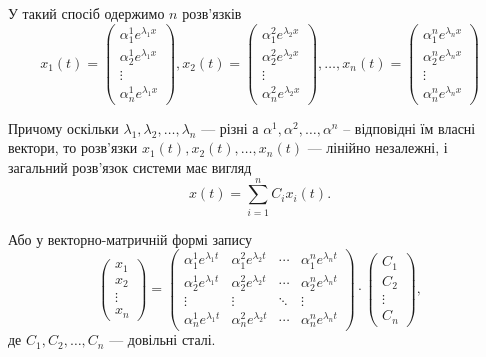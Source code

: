\begin{enumerate}
У такий спосіб одержимо $n$ розв'язків
\begin{equation*}
	x_1(t) = \begin{pmatrix} \alpha_1^1 e^{\lambda_1 x} \\ \alpha_2^1 e^{\lambda_1 x} \\ \vdots \\ \alpha_n^1 e^{\lambda_1 x} \end{pmatrix}, 
	x_2(t) = \begin{pmatrix} \alpha_1^2 e^{\lambda_2 x} \\ \alpha_2^2 e^{\lambda_2 x} \\ \vdots \\ \alpha_n^2 e^{\lambda_2 x} \end{pmatrix},
	\ldots, 
	x_n(t) = \begin{pmatrix} \alpha_1^n e^{\lambda_n x} \\ \alpha_2^n e^{\lambda_n x} \\ \vdots \\ \alpha_n^n e^{\lambda_n x} \end{pmatrix}
\end{equation*}

Причому оскільки $\lambda_1, \lambda_2, \ldots, \lambda_n$ --- різні а $\alpha^1, \alpha^2, \ldots, \alpha^n$ -- відповідні їм власні вектори, то розв'язки $x_1(t), x_2(t), \ldots, x_n(t)$ --- лінійно незалежні, і загальний розв'язок системи має вигляд
\begin{equation*}
	x(t) = \sum_{i = 1}^n C_i x_i(t).
\end{equation*}

Або у векторно-матричній формі запису
\begin{equation*}
	\begin{pmatrix} x_1 \\ x_2 \\ \vdots \\ x_n \end{pmatrix} = 
	\begin{pmatrix}
		\alpha_1^1 e^{\lambda_1 t} & \alpha_1^2 e^{\lambda_2 t} & \cdots & \alpha_1^n e^{\lambda_n t} \\
		\alpha_2^1 e^{\lambda_1 t} & \alpha_2^2 e^{\lambda_2 t} & \cdots & \alpha_2^n e^{\lambda_n t} \\
		\vdots & \vdots & \ddots & \vdots \\
		\alpha_n^1 e^{\lambda_1 t} & \alpha_n^2 e^{\lambda_2 t} & \cdots & \alpha_n^n e^{\lambda_n t}
	\end{pmatrix}
	\cdot
	\begin{pmatrix} C_1 \\ C_2 \\ \vdots \\ C_n \end{pmatrix},
\end{equation*}
де $C_1, C_2, \ldots, C_n$ --- довільні сталі.


\end{enumerate}
